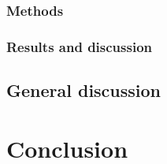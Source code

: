\documentclass[a4paper, 12pt, headings=standardclasses]{scrartcl}
\begin{document}
\subsubsection{Methods}
\subsubsection{Results and discussion}

\subsection{General discussion}

\section{Conclusion}




\newpage

\newpage
{}



\end{document}
